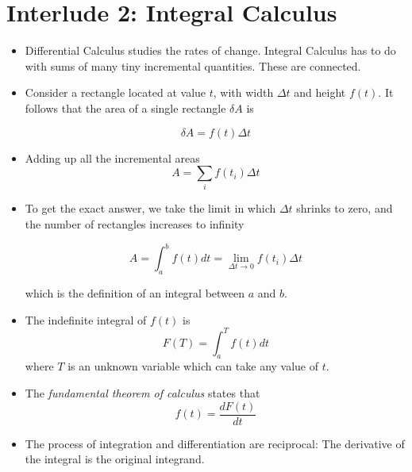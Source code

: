 \documentclass[../main.tex]{subfiles}
\begin{document}
\section{Interlude 2: Integral Calculus}
\begin{itemize}

    \item Differential Calculus studies the rates of change. Integral Calculus
        has to do with sums of many tiny incremental quantities. These are
        connected.
        
    \item Consider a rectangle located at value $t$, with width $\Delta t$ and
        height $f(t)$. It follows that the area of a single rectangle $\delta
        A$ is

        \begin{equation}
            \delta A = f(t)\Delta t
        \end{equation}

    \item Adding up all the incremental areas
        \begin{equation}
            A = \sum_i f(t_i)\Delta t
        \end{equation}

    \item To get the exact answer, we take the limit in which $\Delta t$
        shrinks to zero, and the number of rectangles increases to infinity

        \begin{equation}
            A = \int_a^b f(t) dt = \lim_{\Delta t \rightarrow 0} f(t_i)\Delta t
        \end{equation}

        which is the definition of an integral between $a$ and $b$.

    \item The indefinite integral of $f(t)$ is
        \begin{equation}
            F(T) = \int_a^T f(t) dt
        \end{equation}
        where $T$ is an unknown variable which can take any value of $t$. 

    \item The \textit{fundamental theorem of calculus} states that
        \begin{equation}
            f(t) = \frac{dF(t)}{dt}
        \end{equation}

    \item The process of integration and differentiation are reciprocal: The
        derivative of the integral is the original integrand.


\end{itemize}
\end{document}
